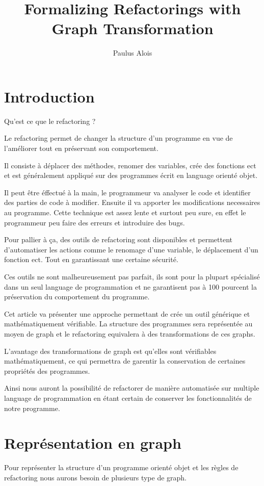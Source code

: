 \documentclass[a4paper, 12pt]{article}
\title{Formalizing Refactorings with Graph Transformation}
\author{Paulus Alois}
\begin{document}
\maketitle

\tableofcontents

\newpage

\section{Introduction}

Qu'est ce que le refactoring ?

Le refactoring permet de changer la structure d'un programme en vue de l'améliorer tout en préservant son comportement.

Il consiste à déplacer des méthodes, renomer des variables, crée des fonctions ect et est généralement appliqué sur des programmes écrit en language orienté objet.

Il peut être éffectué à la main, le programmeur va analyser le code et identifier des parties de code à modifier. Ensuite il va apporter les modifications necessaires au programme.
Cette technique est assez lente et surtout peu sure, en effet le programmeur peu faire des erreurs et introduire des bugs.

Pour pallier à ça, des outils de refactoring sont disponibles et permettent d'automatiser les actions comme le renomage d'une variable, le déplacement d'un fonction ect. Tout en garantissant une certaine sécurité.

Ces outils ne sont malheureusement pas parfait, ils sont pour la plupart spécialisé dans un seul language de programmation et ne garantisent pas à 100 pourcent la préservation du comportement du programme.

Cet article va présenter une approche permettant de crée un outil générique et mathématiquement vérifiable. La structure des programmes sera représentée au moyen de graph et le refactoring equivalera à des transformations de ces graphs.

L'avantage des transformations de graph est qu'elles sont vérifiables mathématiquement, ce qui permettra de garentir la conservation de certaines propriétés des programmes.

Ainsi nous auront la possibilité de refactorer de manière automatisée sur multiple language de programmation en étant certain de conserver les fonctionnalités de notre programme.

\newpage

\section{Représentation en graph}
Pour représenter la structure d'un programme orienté objet et les règles de refactoring nous aurons besoin de plusieurs type de graph.
\end{document}
